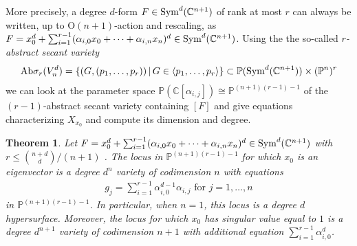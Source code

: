 \documentclass{amsart}
\newtheorem{theorem}{Theorem}
\numberwithin{theorem}{section}
\theoremstyle{definition}
\newcommand{\PP}{\mathbb{P}}
\newcommand{\CC}{\mathbb{C}}
\newcommand{\sym}{\mathop{\rm Sym}\nolimits}
\begin{document}
More precisely, a degree $d$-form $F\in \sym^d (\CC^{n+1})$ of rank at most $r$ can always be written, up to  $\mathrm{O}(n+1)$-action and rescaling, as $F=x_0^d+ \sum_{i=1}^{r-1} (\alpha_{i,0}x_0+\cdots +\alpha_{i,n}x_n)^d\in\sym^d(\CC^{n+1})$. Using the the so-called \emph{$r$-abstract secant variety}
$$
\mathrm{Ab}\sigma_r(V_n^d)=\{ (G, (p_1,\dots,p_r)) \, |\, G\in \langle p_1,\dots, p_r \rangle \} \subset \PP(\sym^d(\CC^{n+1})) \times  (\PP^n)^r
$$
we can look at the parameter space $\PP(\CC[\alpha_{i,j}])\cong \PP^{(n+1)(r-1)-1}$ of the $(r-1)$-abstract secant variety containing $[F]$ and give equations characterizing $X_{x_0}$ and compute its dimension and degree.

\begin{theorem}\label{thm:equationsx0}
     Let $F=x_0^d+\sum_{i=1}^{r-1} (\alpha_{i,0}x_0+\cdots +\alpha_{i,n}x_n)^d\in\sym^d(\CC^{n+1})$ with $r\leq \binom{n+d}{d}/(n+1)$ . The locus in $\PP^{(n+1)(r-1)-1}$ for which $x_0$ is an eigenvector is a degree $d^n$ variety of codimension $n$ with equations 
     \begin{align}\label{eq: equations gj}
     g_j=\sum_{i=1}^{r-1}\alpha_{i,0}^{d-1}\alpha_{i,j} \text{ for }j=1,\dots, n
     \end{align}
     in $\PP^{(n+1)(r-1)-1}$. In particular, when $n=1$, this locus is a degree $d$ hypersurface. Moreover, the locus for which $x_0$ has singular value equal to $1$ is a degree $d^{n+1}$ variety of codimension $n+1$ with additional equation $\sum_{i=1}^{r-1} \alpha_{i,0}^d$.
\end{theorem}
\end{document}
